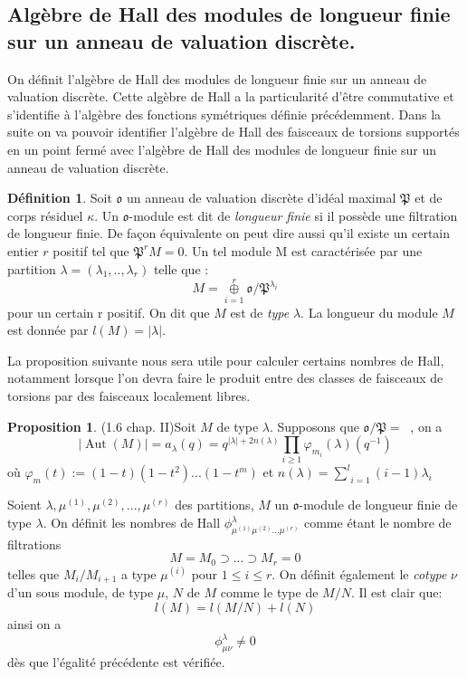 \documentclass[12pt]{article}
\DeclareMathOperator{\aut}{Aut}
\DeclareMathOperator{\Fq}{\mathbb{F}_{q}}
\theoremstyle{definition}
\newtheorem{Prop}{Proposition}[section]
\newtheorem{Def}{Définition}[section]
\begin{document}
\subsection{Algèbre de Hall des modules de longueur finie sur un anneau de valuation discrète.}
On définit l'algèbre de Hall des modules de longueur finie sur un anneau de valuation discrète. Cette algèbre de Hall a la particularité d'être commutative et s'identifie à l'algèbre des fonctions symétriques définie précédemment. Dans la suite on va pouvoir identifier l'algèbre de Hall des faisceaux de torsions supportés en un point fermé avec l'algèbre de Hall des modules de longueur finie sur un anneau de valuation discrète.\begin{Def} Soit $\mathfrak{o}$ un anneau de valuation discrète d'idéal maximal $\mathfrak{P}$ et de corps résiduel $\kappa$. Un $\mathfrak{o}$-module est dit de \textit{longueur finie} si il possède une filtration de longueur finie. De façon équivalente on peut dire aussi qu'il existe un certain entier $r$ positif tel que $\mathfrak{P}^rM=0$. Un tel module M est caractérisée par une partition $\lambda=(\lambda_1,..,\lambda_r)$ telle que : $$M=\underset{i=1}{\overset{r}{\oplus}}\mathfrak{o}/\mathfrak{P}^{\lambda_i}$$ pour un certain r positif. On dit que $M$ est de \textit{type} $\lambda$. La longueur du module $M$ est donnée par $l(M)=\vert\lambda\vert$. \end{Def}
La proposition suivante nous sera utile pour calculer certains nombres de Hall, notamment lorsque l'on devra faire le produit entre des classes de faisceaux de torsions par des faisceaux localement libres. 
\begin{Prop}\cite{Macdonald} (1.6 chap. II)\label{Autmodlf} Soit $M$ de type $\lambda$. Supposons que $\mathfrak{o}/\mathfrak{P}=\Fq$, on a $$\vert\aut(M)\vert=a_{\lambda}(q)=q^{\vert\lambda\vert+2n(\lambda)}\underset{i\geq 1}{\prod}\varphi_{m_i}(\lambda)(q^{-1})$$ où $\varphi_m(t):=(1-t)(1-t^2)...(1-t^m)$ et $n(\lambda)=\underset{i=1}{\overset{l}\sum}(i-1)\lambda_i$ \end{Prop}
Soient $\lambda,\mu^{(1)},\mu^{(2)},...,\mu^{(r)}$ des partitions, $M$ un $\mathfrak{o}$-module de longueur finie de type $\lambda$. On définit les nombres de Hall $\phi^{\lambda}_{\mu^{(1)}\mu^{(2)}...\mu^{(r)}}$ comme étant le nombre de filtrations $$M=M_0\supset...\supset M_r=0$$ telles que $M_i/M_{i+1}$ a type $\mu^{(i)}$ pour $1\leqslant i\leqslant r$. On définit également le \textit{cotype} $\nu$ d'un sous module, de type $\mu$, $N$ de $M$  comme le type de $M/N$. Il est clair que: $$l(M)=l(M/N)+l(N)$$ ainsi on a $$\phi^{\lambda}_{\mu\nu}\neq 0$$ dès que l'égalité précédente est vérifiée.
\end{document}
